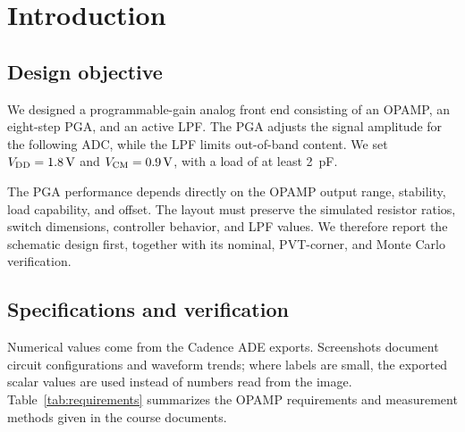 \chapter{Introduction}

\section{Design objective}

We designed a programmable-gain analog front end consisting of an OPAMP, an eight-step PGA, and an active LPF. The PGA adjusts the signal amplitude for the following ADC, while the LPF limits out-of-band content. We set \(V_{\mathrm{DD}}=\SI{1.8}{V}\) and \(V_{\mathrm{CM}}=\SI{0.9}{V}\), with a load of at least \SI{2}{pF}.

The PGA performance depends directly on the OPAMP output range, stability, load capability, and offset. The layout must preserve the simulated resistor ratios, switch dimensions, controller behavior, and LPF values. We therefore report the schematic design first, together with its nominal, PVT-corner, and Monte Carlo verification.

\section{Specifications and verification}

Numerical values come from the Cadence ADE exports. Screenshots document circuit configurations and waveform trends; where labels are small, the exported scalar values are used instead of numbers read from the image. Table~\ref{tab:requirements} summarizes the OPAMP requirements and measurement methods given in the course documents.

